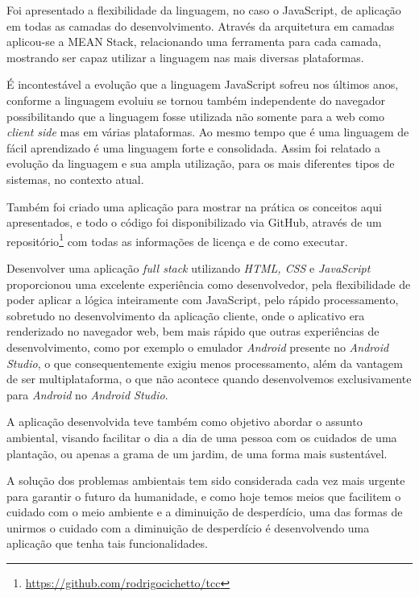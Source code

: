 \documentclass[
	12pt,				%
	openright,			%
	twoside,			%
	a4paper,			%
	english,			%
	brazil				%
	]{abntex2}
\begin{document}
Foi apresentado a flexibilidade da linguagem, no caso o JavaScript, de aplicação em todas as camadas do desenvolvimento. Através da arquitetura em camadas aplicou-se a MEAN Stack, relacionando uma ferramenta para cada camada, mostrando ser capaz utilizar a linguagem nas mais diversas plataformas.

É incontestável a evolução que a linguagem JavaScript sofreu nos últimos anos, conforme a linguagem evoluiu se tornou também independente do navegador possibilitando que a linguagem fosse utilizada não somente para a web como \textit{client side} mas em várias plataformas. Ao mesmo tempo que é uma linguagem de fácil aprendizado é uma linguagem forte e consolidada. Assim foi relatado a evolução da linguagem e sua ampla utilização, para os mais diferentes tipos de sistemas, no contexto atual.

Também foi criado uma aplicação para mostrar na prática os conceitos aqui apresentados, e todo o código foi disponibilizado via GitHub, através de um repositório\footnote{\url{https://github.com/rodrigocichetto/tcc}} com todas as informações de licença e de como executar.

Desenvolver uma aplicação \textit{full stack} utilizando \textit{HTML, CSS} e \textit{JavaScript} proporcionou uma excelente experiência como desenvolvedor, pela flexibilidade de poder aplicar a lógica inteiramente com JavaScript, pelo rápido processamento, sobretudo no desenvolvimento da aplicação cliente, onde o aplicativo era renderizado no navegador web, bem mais rápido que outras experiências de desenvolvimento, como por exemplo o emulador \textit{Android} presente no \textit{Android Studio}, o que consequentemente exigiu menos processamento, além da vantagem de ser multiplataforma, o que não acontece quando desenvolvemos exclusivamente para \textit{Android} no \textit{Android Studio}.

A aplicação desenvolvida teve também como objetivo abordar o assunto ambiental, visando facilitar o dia a dia de uma pessoa com os cuidados de uma plantação, ou apenas a grama de um jardim, de uma forma mais sustentável.

A solução dos problemas ambientais tem sido considerada cada vez mais urgente para garantir o futuro da humanidade, e como hoje temos meios que facilitem o cuidado com o meio ambiente e a diminuição de desperdício, uma das formas de unirmos o cuidado com a diminuição de desperdício é desenvolvendo uma aplicação que tenha tais funcionalidades.

\postextual
\end{document}
